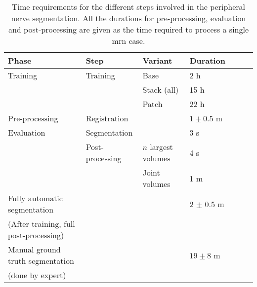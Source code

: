 \begin{table}[htbp]
   \centering
   \caption[Time Requirements]{Time requirements for the different steps involved in the peripheral nerve segmentation. All the durations for pre-processing, evaluation and post-processing are given as the time required to process a single \gls{mrn} case.}
   \begin{tabular}{l*{6}{l}}
      \toprule
      Phase	        & Step                  & Variant               & Duration\\
      \midrule
      Training      & Training              & Base                  & 2 h   \\
                    &                       & Stack (all)           & 15 h  \\
                    &                       & Patch                 & 22 h  \\
      \midrule
      Pre-processing& Registration          &                       & $1 \pm 0.5$ m \\
      \midrule
      Evaluation    & Segmentation          &                       & 3 s \\
                    & Post-processing       & $n$ largest volumes   & 4 s \\
                    &                       & Joint volumes         & 1 m \\
      \midrule
      Fully automatic segmentation & & & 2 $\pm$ 0.5 m\\
      (After training, full post-processing)\\
      \midrule
      Manual ground truth segmentation & & & $19 \pm 8$ m\\
      (done by expert) \\
      \bottomrule
   \end{tabular}
   \label{tab:results_durations}
\end{table}





\endinput